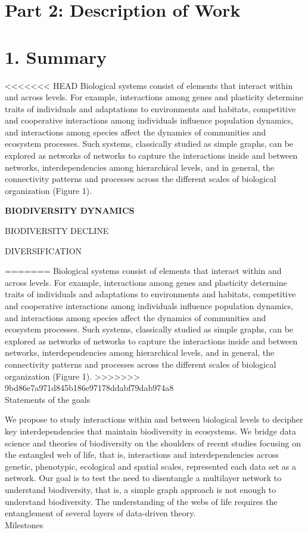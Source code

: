 \documentclass[12pt]{article}
\begin{document}
\pagestyle{empty}

\section*{Part 2: Description of Work}

\section*{1. Summary}
<<<<<<< HEAD
Biological systems consist of elements that interact within and across
levels. For example, interactions among genes and plasticity determine
traits of individuals and adaptations to environments and habitats,
competitive and cooperative interactions among individuals influence
population dynamics, and interactions among species affect the
dynamics of communities and ecosystem processes. Such systems,
classically studied as simple graphs, can be explored as networks of
networks to capture the interactions inside and between networks,
interdependencies among hierarchical levels, and in general, the
connectivity patterns and processes across the different scales of
biological organization (Figure 1).

{\bf BIODIVERSITY DYNAMICS 
 
BIODIVERSITY DECLINE 

DIVERSIFICATION}

=======
Biological systems consist of elements that interact within and across levels. For example, interactions among genes and plasticity determine traits of individuals and adaptations to environments and habitats, competitive and cooperative interactions among individuals influence population dynamics, and interactions among species affect the dynamics of communities and ecosystem processes. Such systems, classically studied as simple graphs, can be explored as networks of networks to capture the interactions inside and between networks, interdependencies among hierarchical levels, and in general, the connectivity patterns and processes across the different scales of biological organization (Figure 1).
>>>>>>> 9bd86e7a971d845b186e97178ddabf79dab974a8
\\
Statements of the goals

We propose to study interactions within and between biological levels to decipher key interdependencies that maintain biodiversity in ecosystems. We bridge data science and theories of biodiversity on the shoulders of recent studies focusing on the entangled web of life, that is, interactions and interdependencies across genetic, phenotypic, ecological and spatial scales, represented each data set as a network. Our goal is to test the need to disentangle a multilayer network to understand biodiversity, that is, a simple graph approach is not enough to understand biodiversity. The understanding of the webs of life requires the entanglement of several layers of data-driven theory.
\\
Milestones
\end{document}
